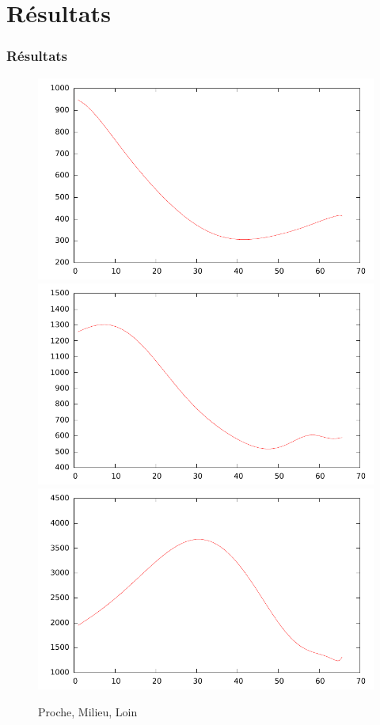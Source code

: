 \documentclass{beamer}
\begin{document}
\section{Résultats}
\begin{frame}
\frametitle{Résultats}
\begin{figure}
\includegraphics[scale=0.3]{near.pdf}
\includegraphics[scale=0.3]{middle.pdf}
\includegraphics[scale=0.3]{far.pdf}
\caption{Proche, Milieu, Loin}
\end{figure}
\end{frame}
\end{document}
